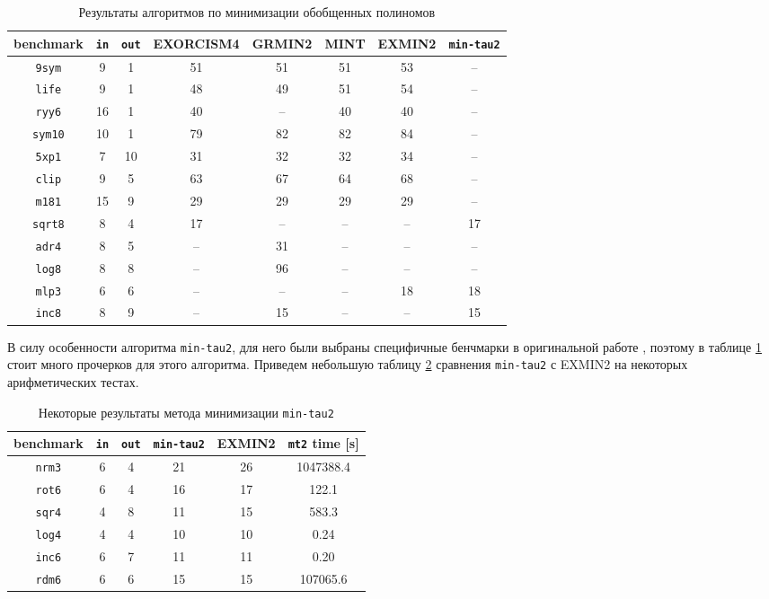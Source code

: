 \documentclass[a4paper,12pt,titlepage,finall]{article}
\begin{document}
\begin{table}[h!]
\centering
\begin{tabular}{ |c||c|c||c|c|c|c|c| }
\hline
\textbf{benchmark} & \texttt{\bf in} & \texttt{\bf out} & \textsc{EXORCISM4} & \textsc{GRMIN2} & \textsc{MINT} & \textsc{EXMIN2} & \texttt{min-tau2} \\
\hline\hline
\texttt{9sym}   & 9  & 1  & 51 & 51 & 51 & 53 & – \\
\hline
\texttt{life}   & 9  & 1  & 48 & 49 & 51 & 54 & – \\
\hline
\texttt{ryy6}   & 16 & 1  & 40 & –  & 40 & 40 & – \\
\hline
\texttt{sym10}  & 10 & 1  & 79 & 82 & 82 & 84 & – \\
\hline\hline
\texttt{5xp1}   & 7  & 10 & 31 & 32 & 32 & 34 & – \\
\hline
\texttt{clip}   & 9  & 5  & 63 & 67 & 64 & 68 & – \\
\hline
\texttt{m181}   & 15 & 9  & 29 & 29 & 29 & 29 & – \\
\hline
\texttt{sqrt8}  & 8  & 4  & 17 & –  & –  & –  & 17 \\
\hline\hline
\texttt{adr4}   & 8  & 5  & –  & 31 & –  & –  & – \\
\hline
\texttt{log8}   & 8  & 8  & –  & 96 & –  & –  & – \\
\hline
\texttt{mlp3}   & 6  & 6  & –  & –  & –  & 18 & 18 \\
\hline
\texttt{inc8}   & 8  & 9  & –  & 15 & –  & –  & 15 \\
\hline
\end{tabular}
\caption{Результаты алгоритмов по минимизации обобщенных полиномов}
\label{table_benchmark}
\end{table}

В силу особенности алгоритма \texttt{min-tau2}, для него были выбраны специфичные бенчмарки в оригинальной работе \cite{min-tau2}, поэтому в таблице \ref{table_benchmark} стоит много прочерков для этого алгоритма. Приведем небольшую таблицу \ref{table_mintau} сравнения \texttt{min-tau2} с \textsc{EXMIN2} на некоторых арифметических тестах.

\begin{table}[h!]
\centering
\begin{tabular}{ |c||c|c||c|c|c| }
\hline
\textbf{benchmark} & \texttt{\bf in} & \texttt{\bf out} & \texttt{min-tau2} & \textsc{EXMIN2} & \texttt{mt2} time [s] \\
\hline\hline
\texttt{nrm3} & 6 & 4 & 21 & 26 & 1047388.4 \\
\hline
\texttt{rot6} & 6 & 4 & 16 & 17 & 122.1     \\
\hline
\texttt{sqr4} & 4 & 8 & 11 & 15 & 583.3     \\
\hline\hline
\texttt{log4} & 4 & 4 & 10 & 10 & 0.24      \\
\hline
\texttt{inc6} & 6 & 7 & 11 & 11 & 0.20      \\
\hline
\texttt{rdm6} & 6 & 6 & 15 & 15 & 107065.6  \\
\hline
\end{tabular}
\caption{Некоторые результаты метода минимизации \texttt{min-tau2}}
\label{table_mintau}
\end{table}
\end{document}
